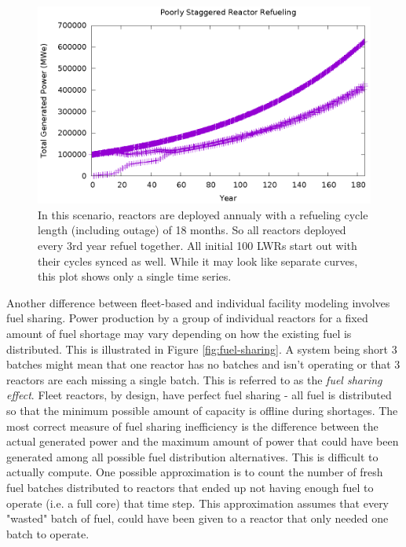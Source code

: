 \documentclass{style}
\begin{document}
\begin{figure}[h]
    \centering
    \includegraphics[width=1.0\columnwidth]{exp2/sync-cycle.eps}
    \caption[The cycle staggering effect]{
        In this scenario, reactors are deployed annualy with a refueling cycle
        length (including outage) of 18 months.  So all reactors deployed
        every 3rd year refuel together.  All initial 100 LWRs start out with
        their cycles synced as well.  While it may look like separate curves,
        this plot shows only a single time series.
    }
    \label{fig:sync-cycle}
\end{figure}

Another difference between fleet-based and individual facility modeling
involves fuel sharing.  Power production by a group of individual reactors for
a fixed amount of fuel shortage may vary depending on how the existing fuel is
distributed.  This is illustrated in Figure \ref{fig:fuel-sharing}.  A system
being short 3 batches might mean that one reactor has no batches and isn't
operating or that 3 reactors are each missing a single batch.  This is
referred to as the \emph{fuel sharing effect}.  Fleet reactors, by design,
have perfect fuel sharing - all fuel is distributed so that the minimum
possible amount of capacity is offline during shortages. The most correct
measure of fuel sharing inefficiency is the difference between the actual
generated power and the maximum amount of power that could have been generated
among all possible fuel distribution alternatives.  This is difficult to
actually compute. One possible approximation is to count the number of fresh
fuel batches distributed to reactors that ended up not having enough fuel to
operate (i.e. a full core) that time step.  This approximation assumes that
every "wasted" batch of fuel, could have been given to a reactor that only
needed one batch to operate.
\end{document}
